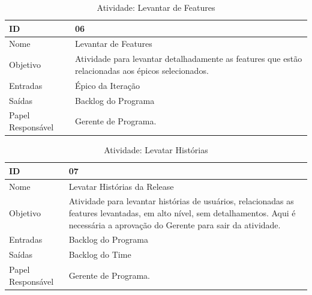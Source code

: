   \begin{table}[H]
    \centering
      \begin{tabular}{| m{5em} | m{10cm} |}
        \hline
        ID       & 06   \\ \hline
        Nome     & Levantar de Features   \\ \hline
        Objetivo & Atividade para levantar detalhadamente as features que estão relacionadas aos épicos selecionados. \\ \hline
        Entradas & Épico da Iteração\\ \hline
        Saídas   & Backlog do Programa \\ \hline
        Papel Responsável   & Gerente de Programa. \\ \hline
      \end{tabular}
      \caption{Atividade: Levantar de Features}
      \label{tabela:atividade6}
  \end{table}

  \begin{table}[H]
    \centering
      \begin{tabular}{| m{5em} | m{10cm} |}
        \hline
        ID       & 07   \\ \hline
        Nome     & Levatar Histórias da Release  \\ \hline
        Objetivo & Atividade para levantar histórias de usuários, relacionadas as features levantadas, em alto nível, sem detalhamentos. Aqui é necessária a aprovação do Gerente para sair da atividade.  \\ \hline
        Entradas & Backlog do Programa\\ \hline
        Saídas   & Backlog do Time \\ \hline
        Papel Responsável   & Gerente de Programa. \\ \hline
      \end{tabular}
      \caption{Atividade: Levatar Histórias}
      \label{tabela:atividade7}
  \end{table}

